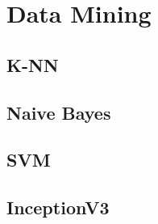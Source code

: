 \documentclass[11pt,titlepage,oneside,openany]{article}
\begin{document}
\section{Data Mining}
\label{sec:class}

\subsection{K-NN}
\subsection{Naive Bayes}
\subsection{SVM}


\subsection{InceptionV3}

\newpage



\end{document}
